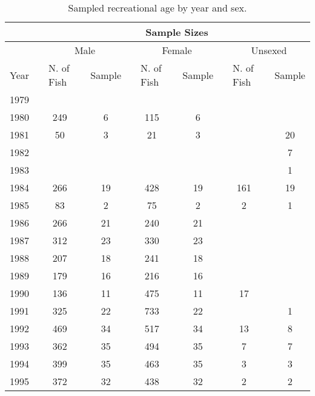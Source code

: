 \begingroup\fontsize{10}{12}\selectfont
\begingroup\fontsize{10}{12}\selectfont

\begin{table}[]
\caption{Sampled recreational age by year and sex.}
\label{tab:rec_age_sample}
\begin{tabular}{rlclccccccccc}
\hline
\multicolumn{1}{l}{} &  & \multicolumn{11}{c}{Sample Sizes} \\ \hline
\multicolumn{1}{l}{} &  & \multicolumn{3}{c}{Male} & \multicolumn{1}{l}{} & \multicolumn{3}{c}{Female} & \multicolumn{1}{l}{} & \multicolumn{3}{c}{Unsexed} \\ \cline{3-5} \cline{7-9} \cline{11-13} 
\multicolumn{1}{l}{Year} &  & \multicolumn{1}{l}{N. of  Fish} &  & \multicolumn{1}{l}{Sample} & \multicolumn{1}{l}{} & \multicolumn{1}{l}{N. of Fish} & \multicolumn{1}{l}{} & \multicolumn{1}{l}{Sample} & \multicolumn{1}{l}{} & \multicolumn{1}{l}{N. of Fish} & \multicolumn{1}{l}{} & \multicolumn{1}{l}{Sample} \\ \hline
1979 &  &  &  &  &  &  &  &  &  &  &  &  \\
1980 &  & 249 &  & 6 &  & 115 &  & 6 &  &  &  &  \\
1981 &  & 50 &  & 3 &  & 21 &  & 3 &  &  &  & 20 \\
1982 &  &  &  &  &  &  &  &  &  &  &  & 7 \\
1983 &  &  &  &  &  &  &  &  &  &  &  & 1 \\
1984 &  & 266 &  & 19 &  & 428 &  & 19 &  & 161 &  & 19 \\
1985 &  & 83 &  & 2 &  & 75 &  & 2 &  & 2 &  & 1 \\
1986 &  & 266 &  & 21 &  & 240 &  & 21 &  &  &  &  \\
1987 &  & 312 &  & 23 &  & 330 &  & 23 &  &  &  &  \\
1988 &  & 207 &  & 18 &  & 241 &  & 18 &  &  &  &  \\
1989 &  & 179 &  & 16 &  & 216 &  & 16 &  &  &  &  \\
1990 &  & 136 &  & 11 &  & 475 &  & 11 &  & 17 &  &  \\
1991 &  & 325 &  & 22 &  & 733 &  & 22 &  &  &  & 1 \\
1992 &  & 469 &  & 34 &  & 517 &  & 34 &  & 13 &  & 8 \\
1993 &  & 362 &  & 35 &  & 494 &  & 35 &  & 7 &  & 7 \\
1994 &  & 399 &  & 35 &  & 463 &  & 35 &  & 3 &  & 3 \\
1995 &  & 372 &  & 32 &  & 438 &  & 32 &  & 2 &  & 2 \\

\end{tabular}
\end{table}
